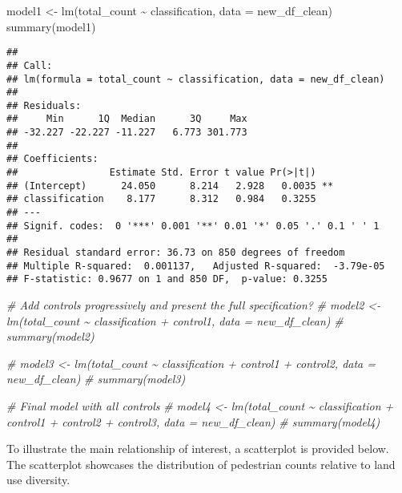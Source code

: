\documentclass[
]{article}
\newenvironment{Shaded}{\begin{snugshade}}{\end{snugshade}}
\newcommand{\AttributeTok}[1]{\textcolor[rgb]{0.77,0.63,0.00}{#1}}
\newcommand{\CommentTok}[1]{\textcolor[rgb]{0.56,0.35,0.01}{\textit{#1}}}
\newcommand{\FunctionTok}[1]{\textcolor[rgb]{0.00,0.00,0.00}{#1}}
\newcommand{\NormalTok}[1]{#1}
\newcommand{\OtherTok}[1]{\textcolor[rgb]{0.56,0.35,0.01}{#1}}
\newcommand{\SpecialCharTok}[1]{\textcolor[rgb]{0.00,0.00,0.00}{#1}}
\begin{document}
\begin{Shaded}
\begin{Highlighting}[]
\NormalTok{model1 }\OtherTok{\textless{}{-}} \FunctionTok{lm}\NormalTok{(total\_count }\SpecialCharTok{\textasciitilde{}}\NormalTok{ classification, }\AttributeTok{data =}\NormalTok{ new\_df\_clean)}
\FunctionTok{summary}\NormalTok{(model1)  }
\end{Highlighting}
\end{Shaded}

\begin{verbatim}
## 
## Call:
## lm(formula = total_count ~ classification, data = new_df_clean)
## 
## Residuals:
##     Min      1Q  Median      3Q     Max 
## -32.227 -22.227 -11.227   6.773 301.773 
## 
## Coefficients:
##                Estimate Std. Error t value Pr(>|t|)   
## (Intercept)      24.050      8.214   2.928   0.0035 **
## classification    8.177      8.312   0.984   0.3255   
## ---
## Signif. codes:  0 '***' 0.001 '**' 0.01 '*' 0.05 '.' 0.1 ' ' 1
## 
## Residual standard error: 36.73 on 850 degrees of freedom
## Multiple R-squared:  0.001137,   Adjusted R-squared:  -3.79e-05 
## F-statistic: 0.9677 on 1 and 850 DF,  p-value: 0.3255
\end{verbatim}

\begin{Shaded}
\begin{Highlighting}[]
\CommentTok{\# Add controls progressively and present the full specification?}
\CommentTok{\# model2 \textless{}{-} lm(total\_count \textasciitilde{} classification + control1, data = new\_df\_clean)}
\CommentTok{\# summary(model2)}

\CommentTok{\# model3 \textless{}{-} lm(total\_count \textasciitilde{} classification + control1 + control2, data = new\_df\_clean)}
\CommentTok{\# summary(model3)}

\CommentTok{\# Final model with all controls}
\CommentTok{\# model4 \textless{}{-} lm(total\_count \textasciitilde{} classification + control1 + control2 + control3, data = new\_df\_clean)}
\CommentTok{\# summary(model4)}
\end{Highlighting}
\end{Shaded}

To illustrate the main relationship of interest, a scatterplot is
provided below. The scatterplot showcases the distribution of pedestrian
counts relative to land use diversity.
\end{document}
